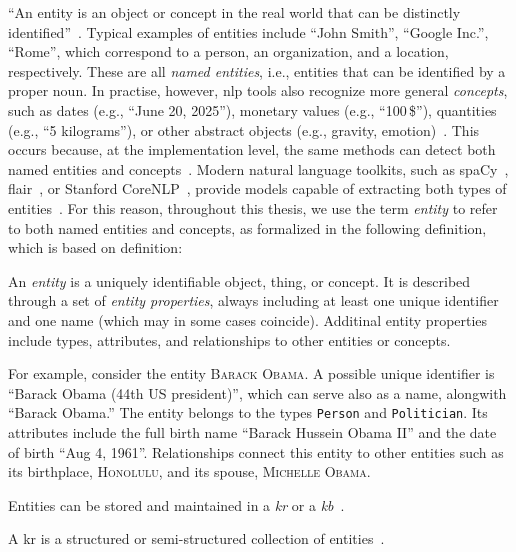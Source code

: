 ``An entity is an object or concept in the real world that can be distinctly identified''~\cite{entityorientedsearch2018}.
Typical examples of entities include ``John Smith'', ``Google Inc.'', ``Rome'', which correspond to a person, an organization, and a location, respectively. These are all \emph{named entities}, i.e., entities that can be identified by a proper noun.
In practise, however, \acl{nlp} tools also recognize more general \emph{concepts}, such as dates (e.g., ``June 20, 2025''), monetary values (e.g., ``100\,\$''), quantities (e.g., ``5 kilograms''), or other abstract objects (e.g., gravity, emotion)~\cite{muc6_overview_1995}.
This occurs because, at the implementation level, the same methods can detect both named entities and concepts~\cite{entityorientedsearch2018}. Modern natural language toolkits, such as spaCy~\cite{honnibal2020spacy}, flair~\cite{akbik2019flair}, or Stanford CoreNLP~\cite{manning-EtAl:2014:P14-5}, provide models capable of extracting both types of entities~\cite{spacy-ner-labels,flair-ner-ontonotes,stanfordnlp-ner}. For this reason, throughout this thesis, we use the term \emph{entity} to refer to both named entities and concepts, as formalized in the following definition, which is based on \textcite{entityorientedsearch2018} definition:
\begin{definition}[Entity]
An \emph{entity} is a uniquely identifiable object, thing, or concept. 
It is described through a set of \emph{entity properties}, always including 
at least one unique identifier and one name (which may in some cases coincide). 
Additinal entity properties include types, attributes, and 
relationships to other entities or concepts.
\end{definition}

For example, consider the entity \textsc{Barack Obama}. 
A possible unique identifier is ``Barack Obama (44th US president)'', which can serve also as a name, alongwith ``Barack Obama.'' 
The entity belongs to the types \texttt{Person} and \texttt{Politician}. 
Its attributes include the full birth name ``Barack Hussein Obama II'' and the date of birth ``Aug 4, 1961''. 
Relationships connect this entity to other entities such as its birthplace, \textsc{Honolulu}, and its spouse, \textsc{Michelle Obama}.

Entities can be stored and maintained in a \emph{\acl{kr}} or a \emph{\acl{kb}}~\cite{entityorientedsearch2018}.
%
\begin{definition}[\Acl{kr}]
A \acf{kr} is a structured or semi-structured collection of entities~\cite{entityorientedsearch2018}.
\end{definition}

